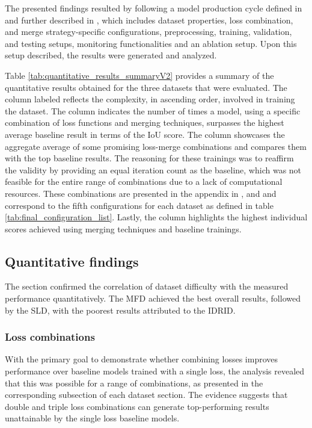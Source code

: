 The presented findings resulted by following a model production cycle defined in  and further described in , which includes dataset properties, loss combination, and merge strategy-specific configurations, preprocessing, training, validation, and testing setups, monitoring functionalities and an ablation setup. Upon this setup described, the results were generated and analyzed.



Table \ref{tab:quantitative_results_summaryV2} provides a summary of the quantitative results obtained for the three datasets that were evaluated. The column labeled  reflects the complexity, in ascending order, involved in training the dataset. The  column indicates the number of times a model, using a specific combination of loss functions and merging techniques, surpasses the highest average baseline result in terms of the \ac{IoU} score. The  column showcases the aggregate average of some promising loss-merge combinations and compares them with the top baseline results. The reasoning for these trainings was to reaffirm the validity by providing an equal iteration count as the baseline, which was not feasible for the entire range of combinations due to a lack of computational resources. These combinations are presented in the appendix in ,  and  and correspond to the fifth configurations for each dataset as defined in table \ref{tab:final_configuration_list}. Lastly, the  column highlights the highest individual scores achieved using merging techniques and baseline trainings.

\subsection{Quantitative findings}
The  section confirmed the correlation of dataset difficulty with the measured performance quantitatively. The \ac{MFD} achieved the best overall results, followed by the \ac{SLD}, with the poorest results attributed to the \ac{IDRID}.

\subsubsection*{Loss combinations}
With the primary goal to demonstrate whether combining losses improves performance over baseline models trained with a single loss, the analysis revealed that this was possible for a range of combinations, as presented in the corresponding  subsection of each dataset section. The evidence suggests that double and triple loss combinations can generate top-performing results unattainable by the single loss baseline models.

